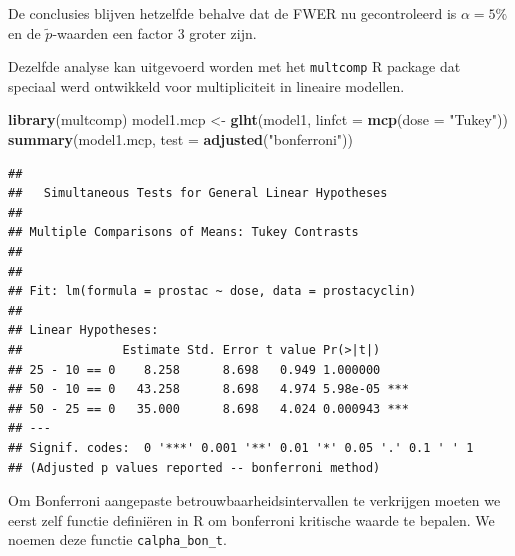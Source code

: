 \documentclass[
  12pt,dutch]{book}
\newenvironment{Shaded}{\begin{snugshade}}{\end{snugshade}}
\newcommand{\AttributeTok}[1]{\textcolor[rgb]{0.13,0.29,0.53}{#1}}
\newcommand{\ControlFlowTok}[1]{\textcolor[rgb]{0.13,0.29,0.53}{\textbf{#1}}}
\newcommand{\DecValTok}[1]{\textcolor[rgb]{0.00,0.00,0.81}{#1}}
\newcommand{\FunctionTok}[1]{\textcolor[rgb]{0.13,0.29,0.53}{\textbf{#1}}}
\newcommand{\NormalTok}[1]{#1}
\newcommand{\OtherTok}[1]{\textcolor[rgb]{0.56,0.35,0.01}{#1}}
\newcommand{\SpecialCharTok}[1]{\textcolor[rgb]{0.81,0.36,0.00}{\textbf{#1}}}
\newcommand{\StringTok}[1]{\textcolor[rgb]{0.31,0.60,0.02}{#1}}
\theoremstyle{definition}
\theoremstyle{definition}
\theoremstyle{definition}
\theoremstyle{definition}
\theoremstyle{remark}
\begin{document}
De conclusies blijven hetzelfde behalve dat de FWER nu gecontroleerd is \(\alpha=5\%\) en de \(\tilde{p}\)-waarden een factor 3 groter zijn.

Dezelfde analyse kan uitgevoerd worden met het \texttt{multcomp} R package dat speciaal werd ontwikkeld voor multipliciteit in lineaire modellen.

\begin{Shaded}
\begin{Highlighting}[]
\FunctionTok{library}\NormalTok{(multcomp)}
\NormalTok{model1.mcp }\OtherTok{\textless{}{-}} \FunctionTok{glht}\NormalTok{(model1, }\AttributeTok{linfct =} \FunctionTok{mcp}\NormalTok{(}\AttributeTok{dose =} \StringTok{"Tukey"}\NormalTok{))}
\FunctionTok{summary}\NormalTok{(model1.mcp, }\AttributeTok{test =} \FunctionTok{adjusted}\NormalTok{(}\StringTok{"bonferroni"}\NormalTok{))}
\end{Highlighting}
\end{Shaded}

\begin{verbatim}
## 
##   Simultaneous Tests for General Linear Hypotheses
## 
## Multiple Comparisons of Means: Tukey Contrasts
## 
## 
## Fit: lm(formula = prostac ~ dose, data = prostacyclin)
## 
## Linear Hypotheses:
##              Estimate Std. Error t value Pr(>|t|)    
## 25 - 10 == 0    8.258      8.698   0.949 1.000000    
## 50 - 10 == 0   43.258      8.698   4.974 5.98e-05 ***
## 50 - 25 == 0   35.000      8.698   4.024 0.000943 ***
## ---
## Signif. codes:  0 '***' 0.001 '**' 0.01 '*' 0.05 '.' 0.1 ' ' 1
## (Adjusted p values reported -- bonferroni method)
\end{verbatim}

Om Bonferroni aangepaste betrouwbaarheidsintervallen te verkrijgen moeten we eerst zelf functie definiëren in R om bonferroni kritische waarde te bepalen. We noemen deze functie \texttt{calpha\_bon\_t}.

\begin{Shaded}
\end{Shaded}
\end{document}
